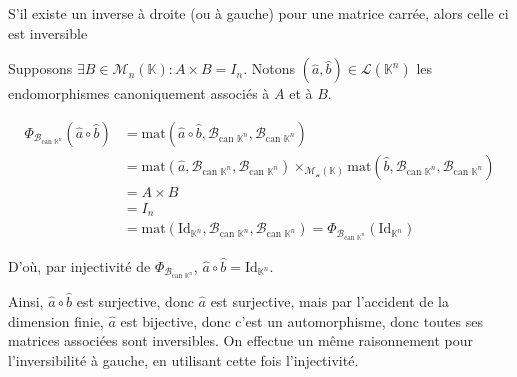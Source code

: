 \documentclass{article}
\date{27 Avril 2024}
\begin{document}
\maketitle

\begin{question_kholle}
	[Soit $A \in \mathcal{M}_{n}(\mathbb{K})$
	\begin{itemize}
		\item S'il existe $B \in \mathcal{M}_{n}(\mathbb{K}):A\times B = I_{n}$, alors $A\in GL_{n}(\mathbb{K})$ et $A^{-1}=B$
		\item S'il existe $B \in \mathcal{M}_{n}(\mathbb{K}):B \times A = I_{n}$, alors $A\in GL_{n}(\mathbb{K})$ et $A^{-1}=B$
	\end{itemize}
	]
	{S'il existe un inverse à droite (ou à gauche) pour une matrice carrée, alors celle ci est inversible}
	
	
	Supposons $\exists B \in \mathcal{M}_{n}(\mathbb{K}):A\times B = I_{n}$. Notons $(\hat{a}, \hat{b}) \in \mathcal{L}(\mathbb{K}^{n})$ les endomorphismes canoniquement associés à $A$ et à $B$.
	
	
	\begin{align*}
		\Phi_{\mathcal{B}_{\text{can } \mathbb{K}^{n}}}(\hat{a} \circ \hat{b}) &= \mathrm{mat}(\hat{a} \circ  \hat{b}, \mathcal{B}_{\text{can } \mathbb{K}^{n}}, \mathcal{B}_{\text{can } \mathbb{K}^{n}}) \\
		&= \mathrm{mat}(\hat{a}, \mathcal{B}_{\text{can } \mathbb{K}^{n}}, \mathcal{B}_{\text{can } \mathbb{K}^{n}}) \times_{\mathcal{M_{n}(\mathbb{K})}} \mathrm{mat}(\hat{b}, \mathcal{B}_{\text{can } \mathbb{K}^{n}}, \mathcal{B}_{\text{can } \mathbb{K}^{n}}) \\
		&= A \times B \\
		&= I_{n} \\
		&= \mathrm{mat}(\mathrm{Id}_{\mathbb{K}^{n}}, \mathcal{B}_{\text{can } \mathbb{K}^{n}}, \mathcal{B}_{\text{can } \mathbb{K}^{n}}) = \Phi_{\mathcal{B}_{\text{can } \mathbb{K}^{n}}}(\mathrm{Id}_{\mathbb{K}^{n}})
	\end{align*}
	
	
	D'où, par injectivité de $\Phi_{\mathcal{B}_{\text{can } \mathbb{K}^{n}}}$, $\hat{a} \circ \hat{b} = \mathrm{Id}_{\mathbb{K}^{n}}$.
	
	Ainsi, $\hat{a} \circ \hat{b}$ est surjective, donc $\hat{a}$ est surjective, mais par l'accident de la dimension finie, $\hat{a}$ est bijective, donc c'est un automorphisme, donc toutes ses matrices associées sont inversibles. On effectue un même raisonnement pour l'inversibilité à gauche, en utilisant cette fois l'injectivité.
\end{question_kholle}
\end{document}

